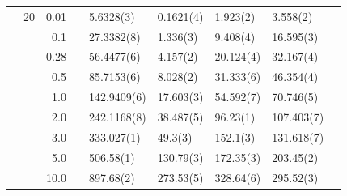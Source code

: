 \begin{table}[H]
\begin{tabularx}{\textwidth}{R{1cm}rrcR{2.3cm}R{2.3cm}R{2.3cm}R{2.3cm}R{1cm}}
		&20 & 0.01 && 5.6328(3) & 0.1621(4) & 1.923(2) & 3.558(2) \\
		&& 0.1 && 27.3382(8) & 1.336(3) & 9.408(4) & 16.595(3) \\
		&& 0.28 && 56.4477(6) & 4.157(2) & 20.124(4) & 32.167(4) \\
		&& 0.5 && 85.7153(6) & 8.028(2) & 31.333(6) & 46.354(4) \\
		&& 1.0 && 142.9409(6) & 17.603(3) & 54.592(7) & 70.746(5) \\
		&& 2.0 && 242.1168(8) & 38.487(5) & 96.23(1) & 107.403(7) \\
		&& 3.0 && 333.027(1) & 49.3(3) & 152.1(3) & 131.618(7) \\ 
		&& 5.0 && 506.58(1) & 130.79(3) & 172.35(3) & 203.45(2) \\
		&& 10.0 && 897.68(2) & 273.53(5) & 328.64(6) & 295.52(3) \\
		\hline \hline
	\end{tabularx}
\end{table}
